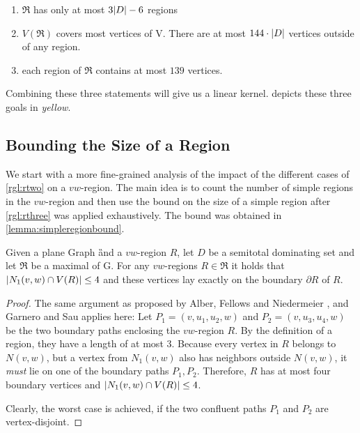 \begin{enumerate}[topsep=0pt,itemsep=-1ex,partopsep=1ex,parsep=1ex]
    \item $\mathfrak{R}$ has only at most $3 \abs{D} - 6$ regions
    \item $V(\mathfrak{R})$ covers most vertices of V. There are at most $144 \cdot \abs{D}$ vertices outside of any region.
    \item each region of $\mathfrak{R}$ contains at most $139$ vertices.
\end{enumerate}

Combining these three statements will give us a linear kernel.  depicts these three goals in \textit{yellow}.
\subsection{Bounding the Size of a Region}

We start with a more fine-grained analysis of the impact of the different cases of \cref{rgl:rtwo} on a $vw$-region. The main idea is to count the number of simple regions in the $vw$-region and then use the bound on the size of a simple region after \cref{rgl:rthree} was applied exhaustively. The bound was obtained in \cref{lemma:simpleregionbound}.   

\begin{lemma}\label{lemma:nonecover}
    Given a plane Graph \G and a $vw$-region $R$, let $D$ be a semitotal dominating set and let $\mathfrak{R}$ be a maximal \dreg of G. 
    For any $vw$-regions $R \in \mathfrak{R}$ it holds that $\abs{N_1(v,w) \cap V(R)} \leq 4$ and these vertices lay exactly on the boundary $\partial R$ of $R$. 
\end{lemma}
\begin{proof}
The same argument as proposed by Alber, Fellows and Niedermeier \cite{Alber2004}, and Garnero and Sau\cite[Proposition 2, Revision 2018]{Garnero2019} applies here:
Let $P_1 = (v, u_1, u_2,w)$ and $P_2 = (v, u_3, u_4,w)$ be the two boundary paths enclosing the $vw$-region $R$. By the definition of a region, they have a length of at most 3. Because every vertex in $R$ belongs to $N(v,w)$, but a vertex from $N_1(v,w)$ also has neighbors outside $N(v,w)$, it \emph{must} lie on one of the boundary paths $P_1, P_2$.
Therefore, $R$ has at most four boundary vertices and $\abs{N_1(v,w) \cap V(R)} \leq 4$.

Clearly, the worst case is achieved, if the two confluent paths $P_1$ and $P_2$ are vertex-disjoint. 
\end{proof}

